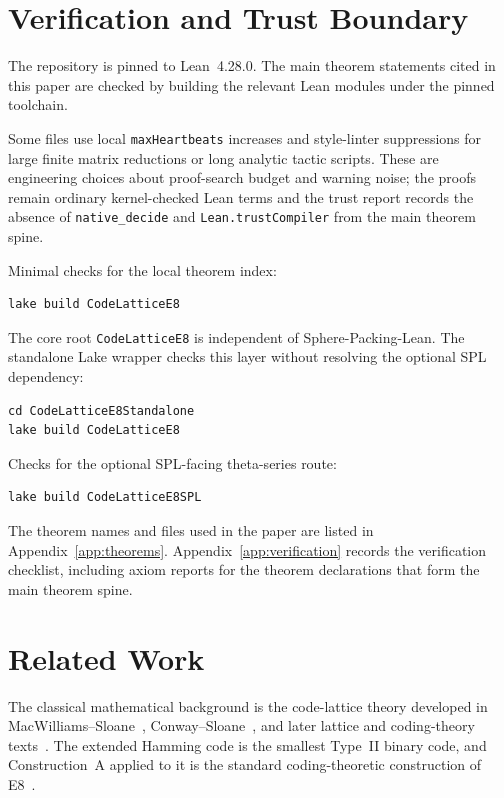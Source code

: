 \documentclass[12pt]{article}
\theoremstyle{definition}
\newcommand{\code}[1]{\texttt{#1}}
\newcommand{\lean}[1]{\texttt{#1}}
\begin{document}
\section{Verification and Trust Boundary}
\label{sec:trust}

The repository is pinned to Lean~4.28.0.  The main theorem statements cited in
this paper are checked by building the relevant Lean modules under the pinned
toolchain.

Some files use local \lean{maxHeartbeats} increases and style-linter
suppressions for large finite matrix reductions or long analytic tactic scripts.
These are engineering choices about proof-search budget and warning noise; the
proofs remain ordinary kernel-checked Lean terms and the trust report records
the absence of \lean{native\_decide} and \lean{Lean.trustCompiler} from the
main theorem spine.

Minimal checks for the local theorem index:
\begin{lstlisting}[style=shell]
lake build CodeLatticeE8
\end{lstlisting}
The core root \code{CodeLatticeE8} is independent of Sphere-Packing-Lean.  The
standalone Lake wrapper checks this layer without resolving the optional SPL
dependency:
\begin{lstlisting}[style=shell]
cd CodeLatticeE8Standalone
lake build CodeLatticeE8
\end{lstlisting}
Checks for the optional SPL-facing theta-series route:
\begin{lstlisting}[style=shell]
lake build CodeLatticeE8SPL
\end{lstlisting}
The theorem names and files used in the paper are listed in
Appendix~\ref{app:theorems}.  Appendix~\ref{app:verification} records the
verification checklist, including axiom reports for the theorem declarations
that form the main theorem spine.

\section{Related Work}
\label{sec:related}

The classical mathematical background is the code-lattice theory developed in
MacWilliams--Sloane~\cite{MacSloane1977}, Conway--Sloane~\cite{ConwaySloane1999},
and later lattice and coding-theory texts~\cite{HuffmanPless2003}.  The extended
Hamming code is the smallest Type~II binary code, and Construction~A applied to
it is the standard coding-theoretic construction of
E8~\cite{LeechSloane1971,ConwaySloane1999}.
\end{document}
